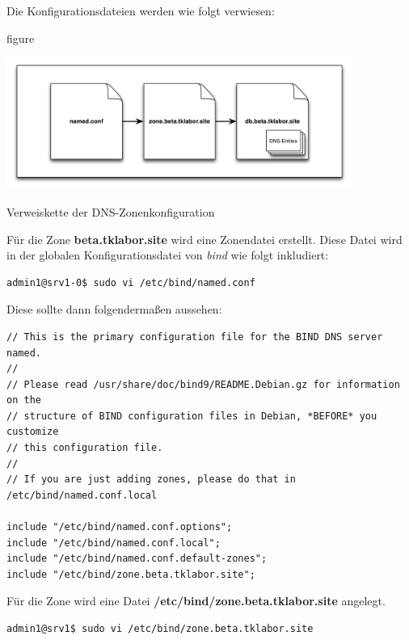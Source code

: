 Die Konfigurationsdateien werden wie folgt verwiesen:

\begin{nofloat}{figure}
	\begin{center}
		\includegraphics[width=0.85\textwidth]{images/dns-files.png}
	\end{center}
	\caption{Verweiskette der DNS-Zonenkonfiguration}
	\label{fig:bind-config-chain}
\end{nofloat}

Für die Zone \textbf{beta.tklabor.site} wird eine Zonendatei erstellt. Diese
Datei wird in der globalen Konfigurationsdatei von \textit{bind} wie folgt
inkludiert:

\begin{lstlisting}
admin1@srv1-0$ sudo vi /etc/bind/named.conf
\end{lstlisting}

Diese sollte dann folgendermaßen aussehen:

\begin{scriptsize}
\begin{lstlisting}
// This is the primary configuration file for the BIND DNS server named.
//
// Please read /usr/share/doc/bind9/README.Debian.gz for information on the 
// structure of BIND configuration files in Debian, *BEFORE* you customize 
// this configuration file.
//
// If you are just adding zones, please do that in /etc/bind/named.conf.local

include "/etc/bind/named.conf.options";
include "/etc/bind/named.conf.local";
include "/etc/bind/named.conf.default-zones";
include "/etc/bind/zone.beta.tklabor.site";
\end{lstlisting}
\end{scriptsize}

Für die Zone wird eine Datei \textbf{/etc/bind/zone.beta.tklabor.site} angelegt.

\begin{lstlisting}
admin1@srv1$ sudo vi /etc/bind/zone.beta.tklabor.site
\end{lstlisting}

